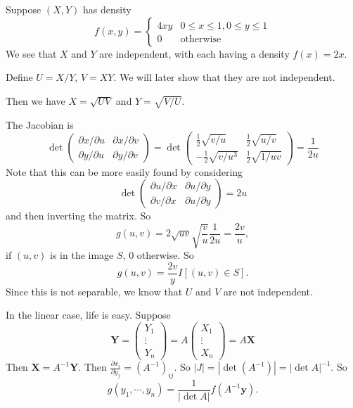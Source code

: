 \documentclass[a4paper]{article}
\begin{document}
\begin{eg}
  Suppose $(X, Y)$ has density
  \[
    f(x, y) =
    \begin{cases}
      4xy & 0 \leq x \leq 1, 0\leq y \leq 1\\
      0 & \text{otherwise}
    \end{cases}
  \]
  We see that $X$ and $Y$ are independent, with each having a density $f(x) = 2x$.

  Define $U = X/Y$, $V = XY$. We will later show that they are not independent.

  Then we have $X = \sqrt{UV}$ and $Y = \sqrt{V/U}$.

  The Jacobian is
  \[
    \det
    \begin{pmatrix}
      \partial x/\partial u & \partial x/\partial v\\
      \partial y/\partial u & \partial y/\partial v
    \end{pmatrix}
    = 
    \det
    \begin{pmatrix}
      \frac{1}{2}\sqrt{v/u} & \frac{1}{2}\sqrt{u/v}\\
      -\frac{1}{2}\sqrt{v/u^3} & \frac{1}{2}\sqrt{1/uv}
    \end{pmatrix}
    = \frac{1}{2u}
  \]
  Note that this can be more easily found by considering
  \[
    \det
    \begin{pmatrix}
      \partial u/\partial x & \partial u/\partial y\\
      \partial v/\partial x & \partial u/\partial y
    \end{pmatrix} = 2u
  \]
  and then inverting the matrix. So
  \[
    g(u, v) = 2\sqrt{uv}\sqrt{\frac{v}{u}}\frac{1}{2u} = \frac{2v}{u},
  \]
  if $(u, v)$ is in the image $S$, $0$ otherwise. So
  \[
    g(u, v) = \frac{2v}{y}I[(u, v)\in S].
  \]
  Since this is not separable, we know that $U$ and $V$ are not independent.
\end{eg}

In the linear case, life is easy. Suppose
\[
  \mathbf{Y} = \begin{pmatrix}
    Y_1\\
    \vdots\\
    Y_n
  \end{pmatrix} = A
  \begin{pmatrix}
    X_1\\
    \vdots\\
    X_n
  \end{pmatrix} = A\mathbf{X}
\]
Then $\mathbf{X} = A^{-1}\mathbf{Y}$. Then $\frac{\partial x_i}{\partial y_j} = (A^{-1})_{ij}$. So $|J| = |\det(A^{-1})| = |\det A|^{-1}$. So
\[
  g(y_1, \cdots, y_n) = \frac{1}{|\det A|}f(A^{-1}\mathbf{y}).
\]
\end{document}

